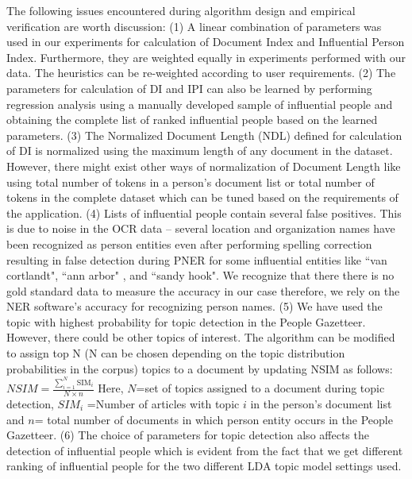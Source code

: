 The following issues encountered during algorithm design and empirical verification are worth discussion:
(1)  A linear combination of parameters was used in our experiments for calculation of Document Index and Influential Person Index. Furthermore, they are weighted equally in experiments performed with our data. The heuristics can be re-weighted according to user requirements. 
(2) The parameters for calculation of DI and IPI can also be learned by performing regression analysis using a manually developed sample of influential people and obtaining the complete list of ranked influential people based on the learned parameters.
(3) The Normalized Document Length (NDL) defined for calculation of DI is normalized using the maximum length of any document in the dataset. However, there might exist other ways of normalization of Document Length like using total number of tokens in a person's document list or total number of tokens in the complete dataset which can be tuned based on the requirements of the application.
(4) Lists of influential people contain several false positives. This is due to noise in the OCR data -- several location and organization names have been recognized as person entities even after performing spelling correction resulting in false detection during PNER for some influential entities like ``van cortlandt", ``ann arbor" ,  and ``sandy hook". We recognize that there there is no gold standard data to measure the accuracy in our case therefore, we rely on the NER software's accuracy for recognizing person names.
(5) We have used the topic with highest probability for topic detection in the People Gazetteer. However, there could be other topics of interest. The algorithm can be modified to assign top N (N can be chosen depending on the topic distribution probabilities in the corpus) topics to a document by updating NSIM as follows: 
 $NSIM=  \frac{\sum_{i=1}^{N}\text{SIM}_i} { N\times n}$
Here, $N$=set of topics assigned to a document during topic detection,  $SIM_i$ =Number of articles with topic $i$ in the person's document list  and $n$= total number of documents in which person entity occurs in the People Gazetteer.
(6) The choice of parameters for topic detection also affects the detection of influential people which is evident from the fact that we get different ranking of influential people for the two different LDA topic model settings used. 





